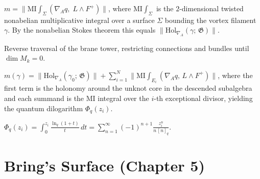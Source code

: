 \begin{definition}
  \label{def:mass-identity}
  $m = \lVert\mathrm{MI}\!\int_\Sigma (\nabla_A q,\; L \wedge F^+)\rVert$,
  where $\mathrm{MI}\!\int_\Sigma$ is the $2$-dimensional twisted nonabelian
  multiplicative integral over a surface $\Sigma$ bounding the vortex
  filament~$\gamma$.  By the nonabelian Stokes theorem this equals
  $\lVert\mathrm{Hol}_{\nabla_A}(\gamma;\,\mathfrak{G})\rVert$.
\end{definition}

\begin{definition}[Descent]
  \label{def:descent}
  Reverse traversal of the brane tower, restricting connections
  and bundles until $\dim M_k = 0$.
\end{definition}

\begin{theorem}
  \label{thm:topological-mass-ch4}
  \leanok
  $m(\gamma) = \lVert\mathrm{Hol}_{\nabla_A}(\gamma_0;\,\mathfrak{G})\rVert
  + \sum_{i=1}^N \lVert\mathrm{MI}\!\int_{E_i}(\nabla_A q,\,L \wedge F^+)\rVert$,
  where the first term is the holonomy around the unknot core in the
  descended subalgebra and each summand is the MI integral over the
  $i$-th exceptional divisor, yielding the quantum dilogarithm
  $\Phi_q(z_i)$.
\end{theorem}

\begin{corollary}
  \label{cor:quantum-dilogarithm}
  $\Phi_q(z_i) = \int_0^{z_i} \frac{\ln_q(1+t)}{t}\,dt
  = \sum_{n=1}^\infty (-1)^{n+1} \frac{z_i^n}{n\,[n]_q}$.
\end{corollary}


\chapter{Bring's Surface (Chapter 5)}

